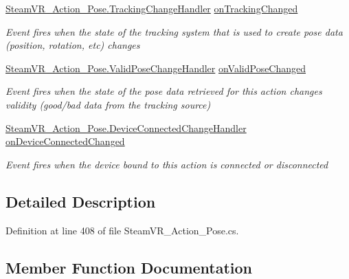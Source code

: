 \begin{DoxyCompactItemize}
\mbox{\hyperlink{class_valve_1_1_v_r_1_1_steam_v_r___action___pose_a52e352705659c14685cf8a88ef4bafd6}{Steam\+V\+R\+\_\+\+Action\+\_\+\+Pose.\+Tracking\+Change\+Handler}} \mbox{\hyperlink{class_valve_1_1_v_r_1_1_steam_v_r___action___pose___source_a609ff1f6d20188ba1a0866e7f8ec8735}{on\+Tracking\+Changed}}
\begin{DoxyCompactList}\small\item\em Event fires when the state of the tracking system that is used to create pose data (position, rotation, etc) changes \end{DoxyCompactList}\item 
\mbox{\hyperlink{class_valve_1_1_v_r_1_1_steam_v_r___action___pose_a742270a6bddfea2afd7f535378ae7830}{Steam\+V\+R\+\_\+\+Action\+\_\+\+Pose.\+Valid\+Pose\+Change\+Handler}} \mbox{\hyperlink{class_valve_1_1_v_r_1_1_steam_v_r___action___pose___source_a0fbc1433f2809fe24d2581f5f326a6e2}{on\+Valid\+Pose\+Changed}}
\begin{DoxyCompactList}\small\item\em Event fires when the state of the pose data retrieved for this action changes validity (good/bad data from the tracking source) \end{DoxyCompactList}\item 
\mbox{\hyperlink{class_valve_1_1_v_r_1_1_steam_v_r___action___pose_a40c6d9862680e8c99781b3a109d94b82}{Steam\+V\+R\+\_\+\+Action\+\_\+\+Pose.\+Device\+Connected\+Change\+Handler}} \mbox{\hyperlink{class_valve_1_1_v_r_1_1_steam_v_r___action___pose___source_ae279d76fd9d0b7ebd1999366897cfc6e}{on\+Device\+Connected\+Changed}}
\begin{DoxyCompactList}\small\item\em Event fires when the device bound to this action is connected or disconnected \end{DoxyCompactList}\end{DoxyCompactItemize}


\subsection{Detailed Description}


Definition at line 408 of file Steam\+V\+R\+\_\+\+Action\+\_\+\+Pose.\+cs.



\subsection{Member Function Documentation}
\mbox{\label{class_valve_1_1_v_r_1_1_steam_v_r___action___pose___source_a3a0883dd58cb29e7cf549199e858c69f}} 
